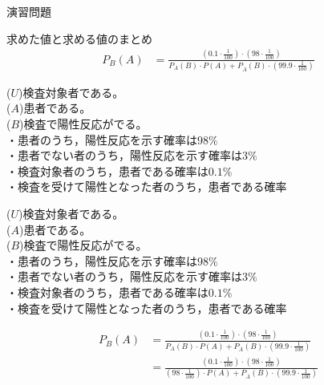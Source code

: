 \documentclass[aspectratio=169, dvipdfmx, 11pt]{beamer}
\begin{document}
\begin{frame}{演習問題}

\begin{alertblock}{求めた値と求める値のまとめ}
\begin{align}
P_B(A)&=\frac{(0.1\cdot \frac{1}{100})\cdot (98\cdot \frac{1}{100})}{P_A(B)\cdot P(A)+P_{\overline{A}}(B)\cdot (99.9\cdot \frac{1}{100})}
\end{align}
\end{alertblock}

($U$)検査対象者である。\\
($A$)患者である。\\
($B$)検査で陽性反応がでる。\\

・患者のうち，陽性反応を示す確率は$98\%$\\
・患者でない者のうち，陽性反応を示す確率は$3\%$\\
・検査対象者のうち，患者である確率は$0.1\%$\\
・検査を受けて陽性となった者のうち，患者である確率

\end{frame}


\begin{frame}
($U$)検査対象者である。\\
($A$)患者である。\\
($B$)検査で陽性反応がでる。\\

・患者のうち，陽性反応を示す確率は$98\%$\\
・患者でない者のうち，陽性反応を示す確率は$3\%$\\
・検査対象者のうち，患者である確率は$0.1\%$\\
・検査を受けて陽性となった者のうち，患者である確率

\begin{align}
P_B(A)&=\frac{(0.1\cdot \frac{1}{100})\cdot (98\cdot \frac{1}{100})}{P_A(B)\cdot P(A)+P_{\overline{A}}(B)\cdot (99.9\cdot \frac{1}{100})}\\
&=\frac{(0.1\cdot \frac{1}{100})\cdot (98\cdot \frac{1}{100})}{(98\cdot \frac{1}{100})\cdot P(A)+P_{\overline{A}}(B)\cdot (99.9\cdot \frac{1}{100})}
\end{align}

\end{frame}
\end{document}
